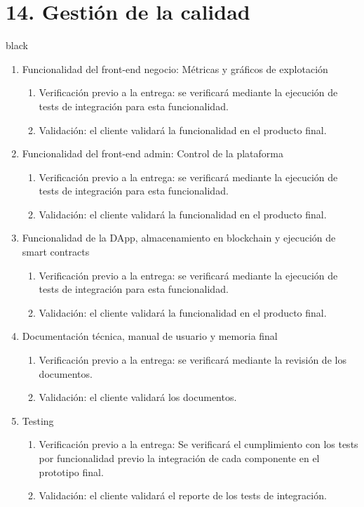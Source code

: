 \documentclass[
11pt, %
]{charter}
\begin{document}
\section{14. Gestión de la calidad}
\label{sec:calidad}
\begin{consigna}{black}
\begin{enumerate}
		\item Funcionalidad del front-end negocio: Métricas y gráficos de explotación
		\begin{enumerate}				
			\item Verificación previo a la entrega: se verificará mediante la ejecución de tests de integración para esta funcionalidad.			
			\item Validación: el cliente validará la funcionalidad en el producto final.			
		\end{enumerate}		
		
		\item Funcionalidad del front-end admin: Control de la plataforma
		\begin{enumerate}				
			\item Verificación previo a la entrega: se verificará mediante la ejecución de tests de integración para esta funcionalidad.			
			\item Validación: el cliente validará la funcionalidad en el producto final.			
		\end{enumerate}		
	
		\item Funcionalidad de la DApp, almacenamiento en blockchain y ejecución de smart contracts
		\begin{enumerate}				
			\item Verificación previo a la entrega: se verificará mediante la ejecución de tests de integración para esta funcionalidad.			
			\item Validación: el cliente validará la funcionalidad en el producto final.			
		\end{enumerate}			
	
			
		
		\item Documentación técnica, manual de usuario y memoria final
		\begin{enumerate}				
			\item Verificación previo a la entrega: se verificará mediante la revisión de los documentos.			
			\item Validación: el cliente validará los documentos.			
		\end{enumerate}			
		
		\item Testing
		\begin{enumerate}				
			\item Verificación previo a la entrega: Se verificará el cumplimiento con los tests por funcionalidad previo la integración de cada componente en el prototipo final.
			\item Validación: el cliente validará el reporte de los tests de integración.
		\end{enumerate}			
		
		
\end{enumerate}


\end{consigna}
\end{document}
